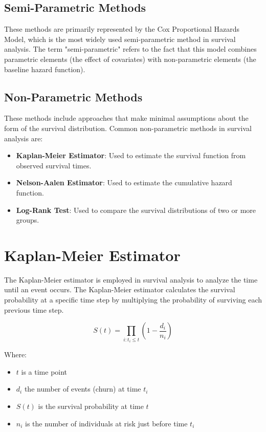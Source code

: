 \documentclass[12pt]{report}
\begin{document}
\subsection{Semi-Parametric Methods}
These methods are primarily represented by the Cox Proportional Hazards Model, which is the most widely used semi-parametric method in survival analysis. The term "semi-parametric" refers to the fact that this model combines parametric elements (the effect of covariates) with non-parametric elements (the baseline hazard function).

\subsection{Non-Parametric Methods}
These methods include approaches that make minimal assumptions about the form of the survival distribution. Common non-parametric methods in survival analysis are:
\begin{itemize}
    \item \textbf{Kaplan-Meier Estimator}: Used to estimate the survival function from observed survival times.
    \item \textbf{Nelson-Aalen Estimator}: Used to estimate the cumulative hazard function.
    \item \textbf{Log-Rank Test}: Used to compare the survival distributions of two or more groups.
\end{itemize}

\section{Kaplan-Meier Estimator}
The Kaplan-Meier estimator is employed in survival analysis to analyze the time until an event occurs. The Kaplan-Meier estimator calculates the survival probability at a specific time step by multiplying the probability of surviving each previous time step.

\[
S(t) = \prod_{i:t_i \leq t} \left(1 - \frac{d_i}{n_i} \right)
\]

Where:
\begin{itemize}
    \item \( t \) is a time point
    \item \( d_i \) the number of events (churn) at time \( t_i \)
    \item \( S(t) \) is the survival probability at time \( t \)
    \item \( n_i \) is the number of individuals at risk just before time \( t_i \)
\end{itemize}
\end{document}
